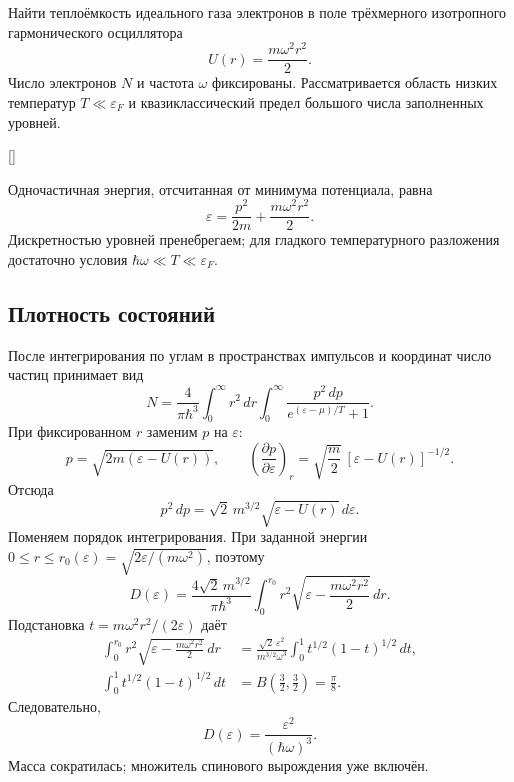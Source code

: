 \documentclass[../final.tex]{subfiles}
\begin{document}

\condition
Найти теплоёмкость идеального газа электронов в поле трёхмерного
изотропного гармонического осциллятора
\[
U(r)=\frac{m\omega^2r^2}{2}.
\]
Число электронов $N$ и частота $\omega$ фиксированы. Рассматривается
область низких температур $T\ll\varepsilon_F$ и квазиклассический
предел большого числа заполненных уровней.

\begin{rbox}[left=16pt,right=16pt,top=12pt,bottom=10pt]{[]}
\centering
{}
\end{rbox}

\solution
Одночастичная энергия, отсчитанная от минимума потенциала, равна
\[
\varepsilon=\frac{p^2}{2m}+\frac{m\omega^2r^2}{2}.
\]
Дискретностью уровней пренебрегаем; для гладкого температурного
разложения достаточно условия $\hbar\omega\ll T\ll\varepsilon_F$.

\subsection*{Плотность состояний}

После интегрирования по углам в пространствах импульсов и координат
число частиц принимает вид
\[
N=\frac{4}{\pi\hbar^3}
    \int_0^\infty r^2\,dr\int_0^\infty
    \frac{p^2\,dp}{e^{(\varepsilon-\mu)/T}+1}.
\]
При фиксированном $r$ заменим $p$ на $\varepsilon$:
\[
p=\sqrt{2m(\varepsilon-U(r))},\qquad
    \left(\frac{\partial p}{\partial\varepsilon}\right)_r
    =\sqrt{\frac m2}\,[\varepsilon-U(r)]^{-1/2}.
\]
Отсюда
\[
p^2\,dp=\sqrt{2}\,m^{3/2}
    \sqrt{\varepsilon-U(r)}\,d\varepsilon.
\]
Поменяем порядок интегрирования. При заданной энергии
$0\le r\le r_0(\varepsilon)=\sqrt{2\varepsilon/(m\omega^2)}$, поэтому
\[
D(\varepsilon)=\frac{4\sqrt2\,m^{3/2}}{\pi\hbar^3}
    \int_0^{r_0}r^2\sqrt{\varepsilon-\frac{m\omega^2r^2}{2}}\,dr.
\]
Подстановка $t=m\omega^2r^2/(2\varepsilon)$ даёт
\begin{align*}
    \int_0^{r_0}r^2\sqrt{\varepsilon-\frac{m\omega^2r^2}{2}}\,dr
    &=\frac{\sqrt2\,\varepsilon^2}{m^{3/2}\omega^3}
    \int_0^1t^{1/2}(1-t)^{1/2}\,dt,\\
    \int_0^1t^{1/2}(1-t)^{1/2}\,dt
    &=B\left(\frac32,\frac32\right)=\frac\pi8.
\end{align*}
Следовательно,
\[
D(\varepsilon)=\frac{\varepsilon^2}{(\hbar\omega)^3}.
\]
Масса сократилась; множитель спинового вырождения уже включён.
\end{document}
